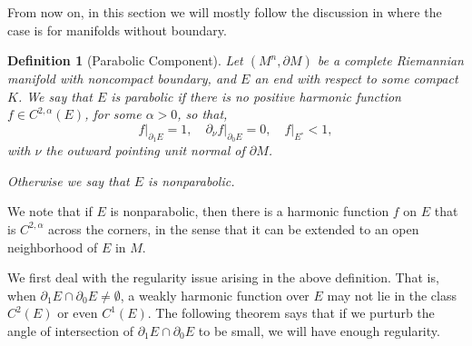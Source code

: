 \documentclass[12pt]{amsart}
\newcommand{\p}{\partial}
\newtheorem{definition}[theorem]{Definition}
\numberwithin{equation}{section}
\begin{document}
	From now on, in this section we will mostly follow the discussion in \cite{ChodoLiStryk2022-CompleteStableMinimal} where the case is for manifolds without boundary.

	\begin{definition}[Parabolic Component] 
		Let $(M^n,\p M)$ be a complete Riemannian manifold with noncompact boundary, and $E$ an end with respect to some compact $K$.
		We say that $E$ is parabolic if there is no  positive harmonic function $f \in C^{2,\alpha}(E)$, for some $\alpha>0$, so that, 
		\begin{equation*}
			f\big|_{\partial_1 E}=1,\quad \partial_{\nu}f\big|_{\partial_0 E}=0, \quad f\big|_{E^{\circ}}<1,
		\end{equation*}
		with $\nu$ the outward pointing unit normal of $\p M$.

		Otherwise we say that $E$ is nonparabolic.
	\end{definition}

	We note that if $E$ is nonparabolic, then there is a harmonic function $f$ on $E$ that is $C^{2,\alpha}$ across the corners, in the sense that it can be extended to an open neighborhood of $E$ in $M$. 

	We first deal with the regularity issue arising in the above definition. That is, when $\p_1 E \cap \p_0 E \neq \emptyset$, a weakly harmonic function over $E$ may not lie in the class $C^2(E)$ or even $C^1(E)$. The following theorem says that if we purturb the angle of intersection of $\p_1 E \cap \p_0 E$ to be small, we will have enough regularity.
	
\end{document}
